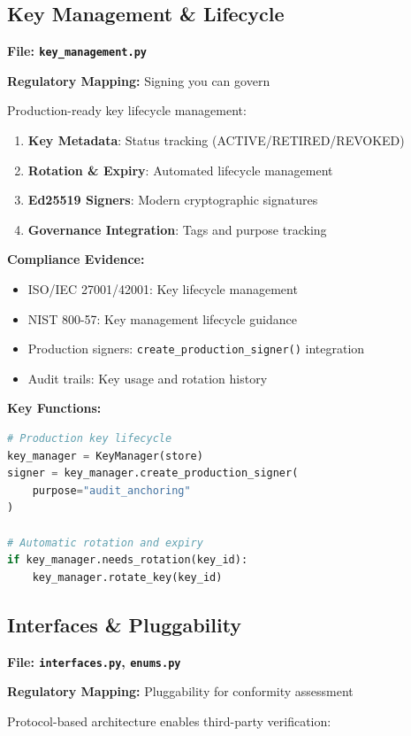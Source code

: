 \documentclass[11pt,a4paper]{article}
\begin{document}
\subsection{Key Management \& Lifecycle}
\textbf{File: \texttt{key\_management.py}}

\textbf{Regulatory Mapping:} Signing you can govern

Production-ready key lifecycle management:

\begin{enumerate}
    \item \textbf{Key Metadata}: Status tracking (ACTIVE/RETIRED/REVOKED)
    \item \textbf{Rotation \& Expiry}: Automated lifecycle management
    \item \textbf{Ed25519 Signers}: Modern cryptographic signatures
    \item \textbf{Governance Integration}: Tags and purpose tracking
\end{enumerate}

\textbf{Compliance Evidence:}
\begin{itemize}
    \item ISO/IEC 27001/42001: Key lifecycle management
    \item NIST 800-57: Key management lifecycle guidance
    \item Production signers: \texttt{create\_production\_signer()} integration
    \item Audit trails: Key usage and rotation history
\end{itemize}

\textbf{Key Functions:}
\begin{lstlisting}[language=Python]
# Production key lifecycle
key_manager = KeyManager(store)
signer = key_manager.create_production_signer(
    purpose="audit_anchoring"
)

# Automatic rotation and expiry
if key_manager.needs_rotation(key_id):
    key_manager.rotate_key(key_id)
\end{lstlisting}

\subsection{Interfaces \& Pluggability}
\textbf{File: \texttt{interfaces.py}, \texttt{enums.py}}

\textbf{Regulatory Mapping:} Pluggability for conformity assessment

Protocol-based architecture enables third-party verification:
\end{document}
